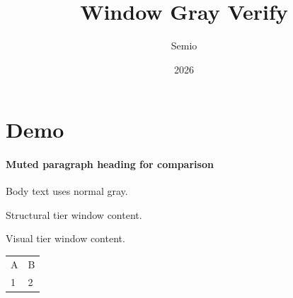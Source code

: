 \documentclass[type=report,theme=light,language=de]{semio}
\title{Window Gray Verify}
\author{Semio}
\date{2026}
\begin{document}
\maketitle
\section{Demo}
\paragraph{Muted paragraph heading for comparison}
Body text uses normal gray.

\begin{Blockquote}[title=Structural Window]
Structural tier window content.
\end{Blockquote}

\begin{Figure}[title=Visual Window]
Visual tier window content.
\end{Figure}

\begin{Table}[title=Logical Window]
\begin{tabular}{ll}
A & B \\
1 & 2 \\
\end{tabular}
\end{Table}
\end{document}
